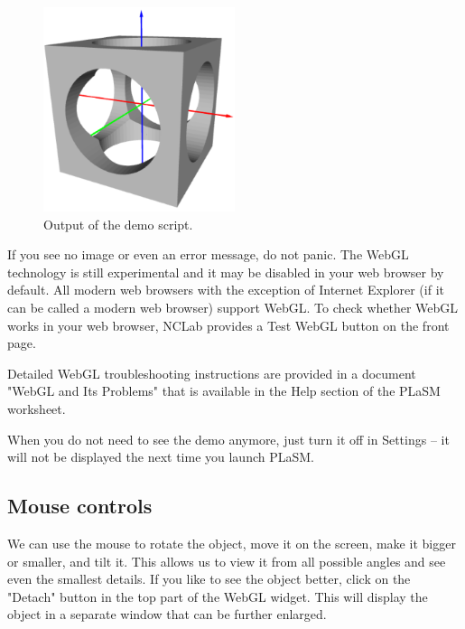 \begin{figure}[!ht]
\begin{center}
\includegraphics[width=0.5\textwidth]{img/demo-111.png}
\end{center}
\vspace{-2mm}
\caption{Output of the demo script.}
\label{fig:demo-111}
\end{figure}
\noindent
If you see no image or even an error message, do not panic. The WebGL 
technology is still experimental and it may be disabled in your web 
browser by default. All modern web browsers with the exception of
Internet Explorer (if it can be called a modern web browser) support 
WebGL. To check whether WebGL works in your web browser, NCLab provides 
a Test WebGL button on the front page. \\

\begin{gbox}
\begin{center}
Detailed WebGL troubleshooting 
instructions are provided in a document "WebGL and Its Problems" 
that is available in the Help section of the PLaSM worksheet.
\end{center}
\end{gbox}
\vspace{6mm}

\noindent
When you do not need to see the demo anymore, just turn it off in Settings -- it 
will not be displayed the next time you launch PLaSM.

\subsection{Mouse controls}

We can use the mouse to rotate the object, move it on the screen, 
make it bigger or smaller, and tilt it. This allows us to view 
it from all possible angles and see even the smallest details. If you like to see the object 
better, click on the "Detach" button in the top part of the WebGL widget.
This will display the object in a separate window that can be further enlarged. \\

